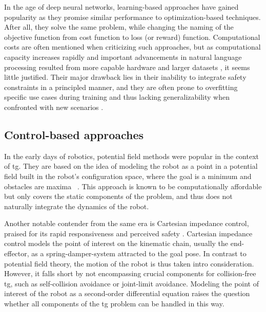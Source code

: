 In the age of deep neural networks, learning-based
approaches have gained popularity as they promise similar
performance to optimization-based techniques. After all,
they solve the same problem, while changing the naming of
the objective function from cost function to loss (or
reward) function. Computational costs are often mentioned when
criticizing such approaches, but as computational capacity
increases rapidly and important advancements in natural
language processing resulted from more capable hardware and
larger datasets \cite{radford2023robust}, it seems little
justified. Their major drawback lies in their
inability to integrate safety constraints in a principled
manner, and they are often prone to overfitting specific use cases during
training and thus lacking generalizability when confronted
with new scenarios \cite{noroozi2023conventional}.

\subsection*{Control-based approaches}
In the early days of robotics, potential field methods were
popular in the context of \ac{tg}.
They are based on the idea of modeling the robot as
a point in a potential field built in the robot's configuration
space, where the goal is a minimum
and obstacles are maxima
~\cite{barraquand1992numerical,hwang1992potential}. This
approach is known to be computationally affordable but
only covers the static components of the problem, and thus
does not naturally integrate the dynamics of the robot.

Another notable contender from the same era is Cartesian
impedance control, praised for its rapid responsiveness and
perceived safety \cite{hogan1985impedance}. Cartesian
impedance control models the point of interest on the
kinematic chain, usually the end-effector, as a
spring-damper-system attracted to the goal pose. In contrast
to potential field theory, the motion of the robot is thus
taken intro consideration. However, it falls short by not
encompassing crucial components for collision-free
\ac{tg}, such as self-collision avoidance or joint-limit
avoidance.
Modeling the point of interest of the robot as a
second-order differential equation raises the question whether all
components of the \ac{tg} problem can be handled in this
way. 

